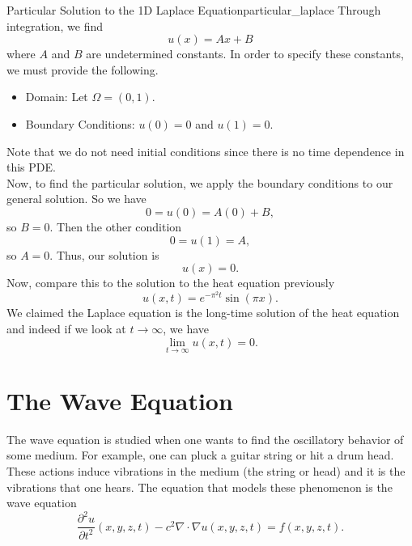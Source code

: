         \begin{ex}{Particular Solution to the 1D Laplace Equation}{particular_laplace}
        Through integration, we find
        \[
        u(x) = Ax+B
        \]
        where $A$ and $B$ are undetermined constants.  In order to specify these constants, we must provide the following.
        \begin{itemize}
            \item Domain: Let $\Omega = (0,1)$.
            \item Boundary Conditions: $u(0)=0$ and $u(1)=0$.  
        \end{itemize}
        Note that we do not need initial conditions since there is no time dependence in this PDE.\\
        
        Now, to find the particular solution, we apply the boundary conditions to our general solution.  So we have
        \[
        0=u(0)=A(0)+B,
        \]
        so $B=0$.  Then the other condition 
        \[
        0=u(1)=A,
        \]
        so $A=0$.  Thus, our solution is
        \[
        \boxed{u(x)=0}.
        \]
        Now, compare this to the solution to the heat equation previously
        \[
        u(x,t)=e^{-\pi^2 t}\sin(\pi x).
        \]
        We claimed the Laplace equation is the long-time solution of the heat equation and indeed if we look at $t\to\infty$, we have
        \[
        \lim_{t\to \infty} u(x,t)=0.
        \]
        \end{ex}
        

        \section{The Wave Equation}
        The wave equation is studied when one wants to find the oscillatory behavior of some medium.  For example, one can pluck a guitar string or hit a drum head.  These actions induce vibrations in the medium (the string or head) and it is the vibrations that one hears.  The equation that models these phenomenon is the wave equation
        \[
        \frac{\partial^2 u}{\partial t^2}(x,y,z,t)-c^2 \nabla \cdot \nabla u(x,y,z,t)=f(x,y,z,t).
        \]
        
